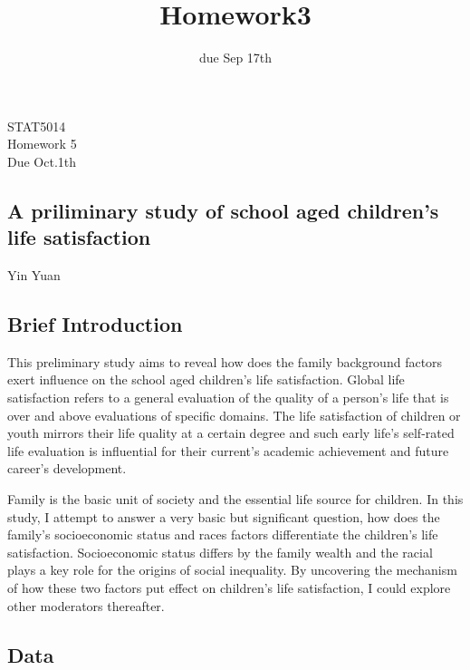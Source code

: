 \documentclass[12pt]{article}
\date{due Sep 17th}
\title{Homework3}
\begin{document}
\newcommand{\argmin}{\text{argmin}}

\noindent STAT5014\\
 Homework 5\\
 Due Oct.1th

\begin{center}
\noindent
\section*{A priliminary study of school aged children's life satisfaction} %
\noindent Yin Yuan\\

\vspace{.25 in}
\end{center}

\subsection*{Brief Introduction}

This preliminary study aims to reveal how does the family background factors exert influence on the school aged children's life satisfaction. Global life satisfaction refers to a general evaluation of the quality of a person’s life that is over and above evaluations of specific domains. The life satisfaction of children or youth mirrors their life quality at a certain degree and such early life’s self-rated life evaluation is influential for their current's academic achievement and future career's development. 

Family is the basic unit of society and the essential life source for children. In this study, I attempt to answer a very basic but significant question, how does the family’s socioeconomic status and races factors differentiate the children’s life satisfaction. Socioeconomic status differs by the family wealth and the racial plays a key role for the origins of social inequality. By uncovering the mechanism of how these two factors put effect on children's life satisfaction, I could explore other moderators thereafter.




\subsection*{Data}
\end{document}
